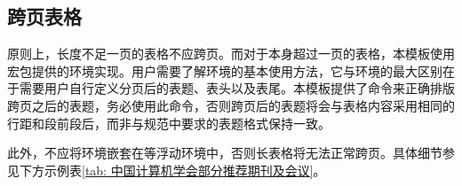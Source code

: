 \documentclass[print, promaster, vlined]{DissertUESTC}
\begin{document}
	
	\clearpage
	\subsection{跨页表格}
	
	原则上，长度不足一页的表格不应跨页。而对于本身超过一页的表格，本模板使用宏包提供的环境实现。用户需要了解环境的基本使用方法，它与环境的最大区别在于需要用户自行定义分页后的表题、表头以及表尾。本模板提供了命令来正确排版跨页之后的表题，务必使用此命令，否则跨页后的表题将会与表格内容采用相同的行距和段前段后，而非与规范中要求的表题格式保持一致。
	
	此外，不应将环境嵌套在等浮动环境中，否则长表格将无法正常跨页。具体细节参见下方示例表\ref{tab: 中国计算机学会部分推荐期刊及会议}。
	
\end{document}
